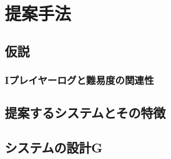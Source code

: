 \chapter{提案手法}

\section{仮説}
\subsection{Iプレイヤーログと難易度の関連性}
\section{提案するシステムとその特徴}
\section{システムの設計G}
